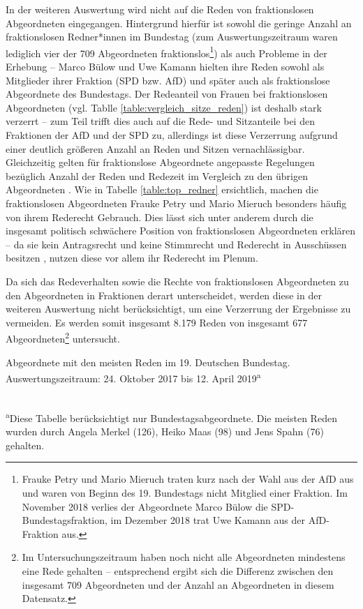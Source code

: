 \documentclass[12pt, 
    twoside=false, 
    bibliography=totoc, 
    numbers=endperiod, 
    headings=normal, 
    toc=chapterentrydotfill
    ]{scrbook}
\begin{document}
In der weiteren Auswertung wird nicht auf die Reden von fraktionslosen Abgeordneten eingegangen. Hintergrund hierfür ist sowohl die geringe Anzahl an fraktionslosen Redner*innen im Bundestag (zum Auswertungszeitraum waren lediglich vier der 709 Abgeordneten fraktionslos\footnote{Frauke Petry und Mario Mieruch traten kurz nach der Wahl aus der AfD aus und waren von Beginn des 19. Bundestags nicht Mitglied einer Fraktion. Im November 2018 verlies der Abgeordnete Marco Bülow die SPD-Bundestagsfraktion, im Dezember 2018 trat Uwe Kamann aus der AfD-Fraktion aus.}) als auch Probleme in der Erhebung -- Marco Bülow und Uwe Kamann hielten ihre Reden sowohl als Mitglieder ihrer Fraktion (SPD bzw. AfD) und später auch als fraktionslose Abgeordnete des Bundestags. Der Redeanteil von Frauen bei fraktionslosen Abgeordneten (vgl. Tablle \ref{table:vergleich_sitze_reden}) ist deshalb stark verzerrt -- zum Teil trifft dies auch auf die Rede- und Sitzanteile bei den Fraktionen der AfD und der SPD zu, allerdings ist diese Verzerrung aufgrund einer deutlich größeren Anzahl an Reden und Sitzen vernachlässigbar.
Gleichzeitig gelten für fraktionslose Abgeordnete angepasste Regelungen bezüglich Anzahl der Reden und Redezeit im Vergleich zu den übrigen Abgeordneten \parencite[vgl.][583f.]{schreiner_2005}. Wie in Tabelle \ref{table:top_redner} ersichtlich, machen die fraktionslosen Abgeordneten Frauke Petry und Mario Mieruch besonders häufig von ihrem Rederecht Gebrauch. Dies lässt sich unter anderem durch die insgesamt politisch schwächere Position von fraktionslosen Abgeordneten erklären \parencite[372]{morlok_2018} -- da sie kein Antragsrecht und keine Stimmrecht und Rederecht in Ausschüssen besitzen \parencite[vgl.][]{morlok_2018}, nutzen diese vor allem ihr Rederecht im Plenum.

Da sich das Redeverhalten sowie die Rechte von fraktionslosen Abgeordneten zu den Abgeordneten in Fraktionen derart unterscheidet, werden diese in der weiteren Auswertung nicht berücksichtigt, um eine Verzerrung der Ergebnisse zu vermeiden. Es werden somit insgesamt 8.179 Reden von insgesamt 677 Abgeordneten\footnote{Im Untersuchungszeitraum haben noch nicht alle Abgeordneten mindestens eine Rede gehalten -- entsprechend ergibt sich die Differenz zwischen den insgesamt 709 Abgeordneten und der Anzahl an Abgeordneten in diesem Datensatz.} untersucht. 

\begin{table}[htb]
    \centering
    \caption[Abgeordnete mit den meisten Reden im 19. Deutschen Bundestag.]{Abgeordnete mit den meisten Reden im 19. Deutschen Bundestag. Auswertungszeitraum: 24. Oktober 2017 bis 12. April 2019\textsuperscript{a}}
     \\
    \small\textsuperscript{a}Diese Tabelle berücksichtigt nur Bundestagsabgeordnete. Die meisten Reden wurden durch Angela Merkel (126), Heiko Maas (98) und Jens Spahn (76) gehalten.
    \label{table:top_redner}
\end{table}
\end{document}
